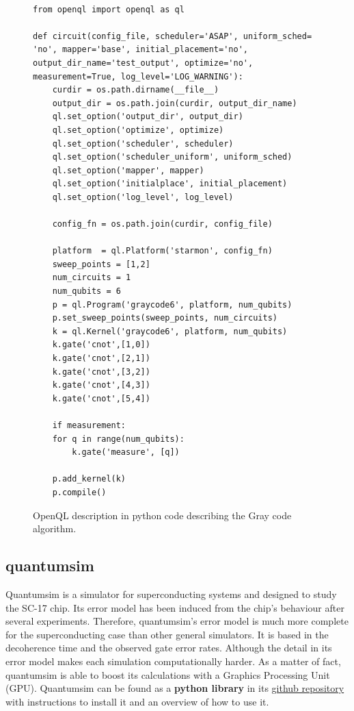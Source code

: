 \begin{figure}
\centering
\begin{minipage}{\textwidth}

\begin{verbatim}

from openql import openql as ql

def circuit(config_file, scheduler='ASAP', uniform_sched= 'no', mapper='base', initial_placement='no', output_dir_name='test_output', optimize='no', measurement=True, log_level='LOG_WARNING'):
    curdir = os.path.dirname(__file__)
    output_dir = os.path.join(curdir, output_dir_name)
    ql.set_option('output_dir', output_dir)
    ql.set_option('optimize', optimize)
    ql.set_option('scheduler', scheduler)
    ql.set_option('scheduler_uniform', uniform_sched)
    ql.set_option('mapper', mapper)
    ql.set_option('initialplace', initial_placement)
    ql.set_option('log_level', log_level)

    config_fn = os.path.join(curdir, config_file)

    platform  = ql.Platform('starmon', config_fn)
    sweep_points = [1,2]
    num_circuits = 1
    num_qubits = 6
    p = ql.Program('graycode6', platform, num_qubits)
    p.set_sweep_points(sweep_points, num_circuits)
    k = ql.Kernel('graycode6', platform, num_qubits)
    k.gate('cnot',[1,0])
    k.gate('cnot',[2,1])
    k.gate('cnot',[3,2])
    k.gate('cnot',[4,3])
    k.gate('cnot',[5,4])

    if measurement:
	for q in range(num_qubits):
	    k.gate('measure', [q])

    p.add_kernel(k)
    p.compile()

\end{verbatim}

\caption{OpenQL description in python code describing the Gray code algorithm.}
\label{code:openql_gray_code}
\end{minipage}
\end{figure}

\subsection*{quantumsim}
\label{sec:org38b5af4}

Quantumsim \cite{O_Brien_2017} is a simulator for superconducting systems and designed to study the SC-17 chip.
Its error model has been induced from the chip's behaviour after several experiments.
Therefore, quantumsim's error model is much more complete for the superconducting case than other general simulators.
It is based in the decoherence time and the observed gate error rates.
Although the detail in its error model makes each simulation computationally harder.
As a matter of fact, quantumsim is able to boost its calculations with a Graphics Processing Unit (GPU).
Quantumsim can be found as a \textbf{python library} in its \href{https://github.com/quantumsim/quantumsim}{github repository} with instructions to install it and an overview of how to use it.

